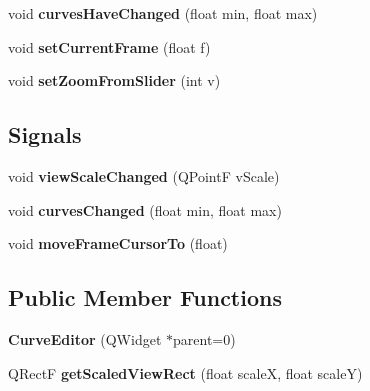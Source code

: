 \begin{DoxyCompactItemize}
\item 
\hypertarget{class_curve_editor_ac026c5193866507e45235be245d877f0}{
void {\bfseries curves\-Have\-Changed} (float min, float max)}
\label{class_curve_editor_ac026c5193866507e45235be245d877f0}

\item 
\hypertarget{class_curve_editor_a45f7662564c1d805d051e349835ef123}{
void {\bfseries set\-Current\-Frame} (float f)}
\label{class_curve_editor_a45f7662564c1d805d051e349835ef123}

\item 
\hypertarget{class_curve_editor_a1bf4eb64cf13536c07199c4e12421e78}{
void {\bfseries set\-Zoom\-From\-Slider} (int v)}
\label{class_curve_editor_a1bf4eb64cf13536c07199c4e12421e78}

\end{DoxyCompactItemize}
\subsection*{\-Signals}
\begin{DoxyCompactItemize}
\item 
\hypertarget{class_curve_editor_a37529987bfc1254ea5aca2c40d83d012}{
void {\bfseries view\-Scale\-Changed} (\-Q\-Point\-F v\-Scale)}
\label{class_curve_editor_a37529987bfc1254ea5aca2c40d83d012}

\item 
\hypertarget{class_curve_editor_aca2534ad077d6d17e12f1ffda4290096}{
void {\bfseries curves\-Changed} (float min, float max)}
\label{class_curve_editor_aca2534ad077d6d17e12f1ffda4290096}

\item 
\hypertarget{class_curve_editor_a18d0e76d91efc0e1d37ded146fb96e23}{
void {\bfseries move\-Frame\-Cursor\-To} (float)}
\label{class_curve_editor_a18d0e76d91efc0e1d37ded146fb96e23}

\end{DoxyCompactItemize}
\subsection*{\-Public \-Member \-Functions}
\begin{DoxyCompactItemize}
\item 
\hypertarget{class_curve_editor_aa37191635751f2912b127bec7867e50e}{
{\bfseries \-Curve\-Editor} (\-Q\-Widget $\ast$parent=0)}
\label{class_curve_editor_aa37191635751f2912b127bec7867e50e}

\item 
\hypertarget{class_curve_editor_a6819d6b1b94ed2a000fbda156f4044ad}{
\-Q\-Rect\-F {\bfseries get\-Scaled\-View\-Rect} (float scale\-X, float scale\-Y)}
\label{class_curve_editor_a6819d6b1b94ed2a000fbda156f4044ad}

\end{DoxyCompactItemize}
